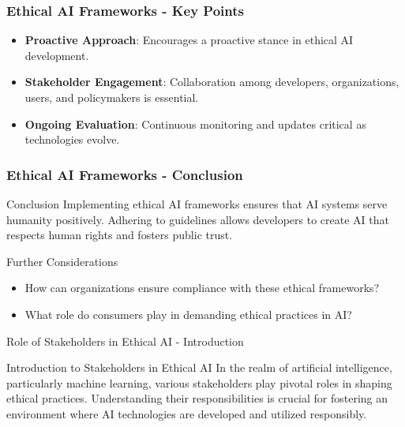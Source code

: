 \documentclass[aspectratio=169]{beamer}
\begin{document}
\begin{frame}[fragile]
    \frametitle{Ethical AI Frameworks - Key Points}
    \begin{itemize}
        \item \textbf{Proactive Approach}: Encourages a proactive stance in ethical AI development.
        \item \textbf{Stakeholder Engagement}: Collaboration among developers, organizations, users, and policymakers is essential.
        \item \textbf{Ongoing Evaluation}: Continuous monitoring and updates critical as technologies evolve.
    \end{itemize}
\end{frame}

\begin{frame}[fragile]
    \frametitle{Ethical AI Frameworks - Conclusion}
    \begin{block}{Conclusion}
        Implementing ethical AI frameworks ensures that AI systems serve humanity positively. Adhering to guidelines allows developers to create AI that respects human rights and fosters public trust.
    \end{block}

    \begin{block}{Further Considerations}
        \begin{itemize}
            \item How can organizations ensure compliance with these ethical frameworks?
            \item What role do consumers play in demanding ethical practices in AI?
        \end{itemize}
    \end{block}
\end{frame}

\begin{frame}[fragile]{Role of Stakeholders in Ethical AI - Introduction}
    \begin{block}{Introduction to Stakeholders in Ethical AI}
        In the realm of artificial intelligence, particularly machine learning, various stakeholders play pivotal roles in shaping ethical practices. Understanding their responsibilities is crucial for fostering an environment where AI technologies are developed and utilized responsibly.
    \end{block}
\end{frame}
\end{document}
